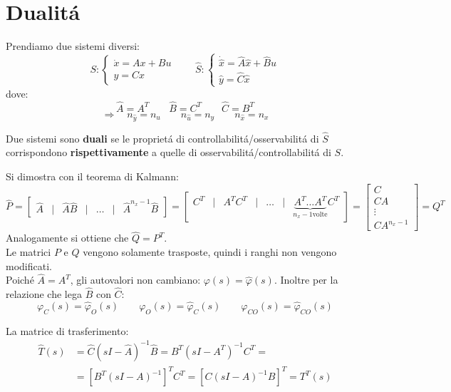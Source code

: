\documentclass[../main.tex]{subfiles}
\begin{document}
	\section{Dualit\'a}
		Prendiamo due sistemi diversi:
		\[
			S:
			\begin{cases}
				\dot x = Ax + Bu\\
				y = Cx
			\end{cases}
			\qquad
			\hat S:
			\begin{cases}
				\dot{\hat x} = \hat A \hat x + \hat B \hat u\\
				\hat y = \hat C \hat x
			\end{cases}
		\]
		dove:
		\[
			\hat A = A^T \qquad \hat B = C^T \qquad \hat C = B^T
		\]
		\[
			\Rightarrow\quad n_{\hat y} = n_u \qquad n_{\hat u} = n_y \qquad n_{\hat x} = n_x
		\]
		
		Due sistemi sono \textbf{duali} se le propriet\'a di controllabilit\'a/osservabilit\'a di $ \hat S $ corrispondono \textbf{rispettivamente} a quelle di osservabilit\'a/controllabilit\'a di $ S $.
		
		Si dimostra con il teorema di Kalmann:
		\[
			\hat P =
			\begin{bmatrix}
				\hat A & | & \hat A \hat B & | & \dots & | & \hat{A}^{n_x-1} \hat B
			\end{bmatrix} =
			\begin{bmatrix}
				C^T &|& A^T C^T &|& \dots &|& \underbrace{A^T \dots A^T}_{n_x-1 \text{volte}} C^T
			\end{bmatrix} =
			\begin{bmatrix}
				C\\
				CA\\
				\vdots\\
				CA^{n_x-1}
			\end{bmatrix} = Q^T
		\]
		Analogamente si ottiene che $ \hat Q = P^T $.\\
		\newline
		Le matrici $ P $ e $ Q $ vengono solamente trasposte, quindi i ranghi non vengono modificati.\\
		Poich\'e $ \hat A = A^T $, gli autovalori non cambiano: $ \varphi(s) = \hat \varphi(s) $. Inoltre per la relazione che lega $ \hat B $ con $ \hat C $:
		\[
			\varphi_C(s) = \hat \varphi_O(s) \qquad \varphi_O(s) = \hat \varphi_C(s) \qquad \varphi_{CO}(s) = \hat \varphi_{CO}(s)
		\]
		
		La matrice di trasferimento:
		\begin{align*}
			\hat T(s) &= \hat C(sI-\hat A)^{-1} \hat B = B^T (sI-A^T)^{-1} C^T =\\
			&= \left[ B^T (sI-A)^{-1} \right]^{T} C^T = \left[ C(sI-A)^{-1} B \right]^T = T^T(s) 
		\end{align*}
\end{document}
